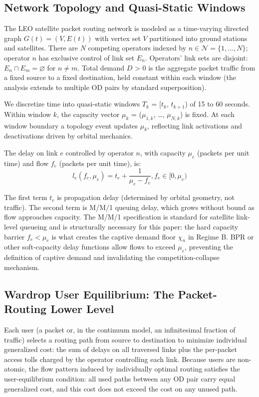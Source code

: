 \documentclass[review,3p,authoryear]{elsarticle}
\begin{document}
\subsection{Network Topology and Quasi-Static Windows}

The LEO satellite packet routing network is modeled as a time-varying directed graph $G(t) = (V, E(t))$ with vertex set $V$ partitioned into ground stations and satellites. There are $N$ competing operators indexed by $n {\in} \mathscr{N} = \{1, {\dots}, N\}$; operator $n$ has exclusive control of link set $E_{n}$. Operators' link sets are disjoint: $E_{n} {\cap} E_{m} = {\varnothing}$ for $n {\ne} m$. Total demand $D$ > 0 is the aggregate packet traffic from a fixed source to a fixed destination, held constant within each window (the analysis extends to multiple OD pairs by standard superposition).

We discretize time into quasi-static windows $T_{k}$ = [$t_{k}$, $t_{k+1}$) of 15 to 60 seconds. Within window $k$, the capacity vector ${\mu}_{k}$ = (${\mu}_{1,k}$, \dots, ${\mu}_{N,k}$) is fixed. At each window boundary a topology event updates ${\mu}_{k}$, reflecting link activations and deactivations driven by orbital mechanics.

The delay on link $e$ controlled by operator $n$, with capacity ${\mu}_{e}$ (packets per unit time) and flow $f_{e}$ (packets per unit time), is:
\begin{equation}
    l_e (f_e, \mu_e) = t_{e} + \frac{1}{\mu_{e} - f_{e}}, f_e \in [0, \mu_e)
    \label{eq1}
\end{equation}

The first term $t_{e}$ is propagation delay (determined by orbital geometry, not traffic). The second term is M/M/1 queuing delay, which grows without bound as flow approaches capacity. The M/M/1 specification is standard for satellite link-level queueing \citet{bertsekas1987} and is structurally necessary for this paper: the hard capacity barrier $f_{e} < {\mu}_{e}$ is what creates the captive demand floor ${\chi}_{n}$ in Regime B. BPR or other soft-capacity delay functions allow flows to exceed ${\mu}_{e}$, preventing the definition of captive demand and invalidating the competition-collapse mechanism.

\subsection{Wardrop User Equilibrium: The Packet-Routing Lower Level}

Each user (a packet or, in the continuum model, an infinitesimal fraction of traffic) selects a
routing path from source to destination to minimize individual generalized cost: the sum of
delays on all traversed links plus the per-packet access tolls charged by the operator
controlling each link. Because users are non-atomic, the flow pattern induced by individually
optimal routing satisfies the \cite{wardrop1952road} user-equilibrium condition: all used paths
between any OD pair carry equal generalized cost, and this cost does not exceed the cost on
any unused path.
\end{document}
